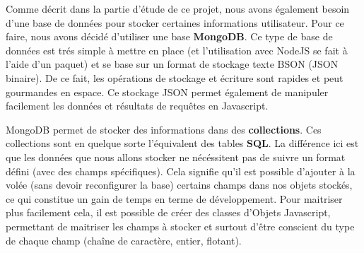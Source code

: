 Comme décrit dans la partie d'étude de ce projet, nous avons également besoin d'une base de données pour stocker certaines informations utilisateur.
Pour ce faire, nous avons décidé d'utiliser une base \textbf{MongoDB}. Ce type de base de données est trés simple à mettre en place (et l'utilisation avec NodeJS se fait à l'aide d'un paquet) et se base sur un format de stockage texte BSON (JSON binaire). De ce fait, les opérations de stockage et écriture sont rapides et peut gourmandes en espace. Ce stockage JSON permet également de manipuler facilement les données et résultats de requêtes en Javascript.

MongoDB permet de stocker des informations dans des \textbf{collections}. Ces collections sont en quelque sorte l'équivalent des tables \textbf{SQL}. La différence ici est que les données que nous allons stocker ne nécéssitent pas de suivre un format défini (avec des champs spécifiques). Cela signifie qu'il est possible d'ajouter à la volée (sans devoir reconfigurer la base) certains champs dans nos objets stockés, ce qui constitue un gain de temps en terme de développement. Pour maitriser plus facilement cela, il est possible de créer des classes d'Objets Javascript, permettant de maitriser les champs à stocker et surtout d'être conscient du type de chaque champ (chaîne de caractère, entier, flotant).